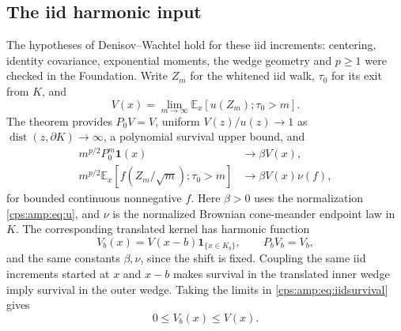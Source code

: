 \documentclass[11pt,letterpaper]{article}
\numberwithin{equation}{section}
\theoremstyle{remark}\newtheorem{remark}[theorem]{Remark}
\newcommand{\EE}{\mathbb E}
\newcommand{\one}{\mathbf 1}
\begin{document}
\subsection{The iid harmonic input}
The hypotheses of Denisov--Wachtel \cite[Theorems 2--3]{DWrevisited} hold for these iid increments: centering, identity covariance, exponential moments, the wedge geometry and $p\ge1$ were checked in the Foundation. Write $Z_m$ for the whitened iid walk, $\tau_0$ for its exit from $K$, and
\begin{equation}\label{cps:amp:eq:V}
 V(x)=\lim_{m\to\infty}\EE_x[u(Z_m);\tau_0>m].
\end{equation}
The theorem provides $P_0V=V$, uniform $V(z)/u(z)\to1$ as $\operatorname{dist}(z,\partial K)\to\infty$, a polynomial survival upper bound, and
\begin{align}
 m^{p/2}P_0^m\one(x)&\longrightarrow\beta V(x),\label{cps:amp:eq:iidsurvival}\\
 m^{p/2}\EE_x[f(Z_m/\sqrt m);\tau_0>m]
 &\longrightarrow\beta V(x)\nu(f),\label{cps:amp:eq:iidYaglom}
\end{align}
for bounded continuous nonnegative $f$. Here $\beta>0$ uses the normalization \eqref{cps:amp:eq:u}, and $\nu$ is the normalized Brownian cone-meander endpoint law in $K$. The corresponding translated kernel has harmonic function
\begin{equation}\label{cps:amp:eq:Vb}
 V_b(x)=V(x-b)\one_{\{x\in K_b\}},\qquad P_bV_b=V_b,
\end{equation}
and the same constants $\beta,\nu$, since the shift is fixed. Coupling the same iid increments started at $x$ and $x-b$ makes survival in the translated inner wedge imply survival in the outer wedge. Taking the limits in \eqref{cps:amp:eq:iidsurvival} gives
\begin{equation}\label{cps:amp:eq:Vorder}
 0\le V_b(x)\le V(x).
\end{equation}
\end{document}
